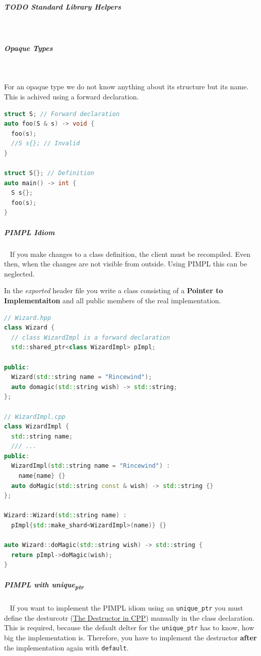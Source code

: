 \documentclass[11pt,twoside,landscape]{article}
\begin{document}
\begin{multicols}{2}
\subparagraph{{\bfseries\sffamily TODO} Standard Library Helpers} \
\label{sec:org0ee2676}
\subparagraph{Opaque Types} \
\label{sec:org2972fca}

For an opaque type we do not know anything about its structure but its name.
This is achived using a forward declaration.

\begin{lstlisting}[language=c++,label=lst:example-for-an-opaque-type,numbers=none]
struct S; // Forward declaration
auto foo(S & s) -> void {
  foo(s);
  //S s{}; // Invalid
}

struct S{}; // Definition
auto main() -> int {
  S s{};
  foo(s);
}
\end{lstlisting}

\subparagraph{PIMPL Idiom} \
\label{sec:org786722e}
If you make changes to a class definition, the client must be recompiled.
Even then, when the changes are not visible from outside.
Using PIMPL this can be neglected.

In the \emph{exported} header file you write a class consisting of a \textbf{Pointer to Implementaiton} and all public members of the real implementation.

\begin{lstlisting}[language=c++,caption={PIMPL example using shared\textsubscript{ptr}},captionpos=b,numbers=none]
// Wizard.hpp
class Wizard {
  // class WizardImpl is a forward declaration
  std::shared_ptr<class WizardImpl> pImpl;

public:
  Wizard(std::string name = "Rincewind");
  auto domagic(std::string wish) -> std::string;
};

// WizardImpl.cpp
class WizardImpl {
  std::string name;
  /// ...
public:
  WizardImpl(std::string name = "Rincewind") :
    name{name} {}
  auto doMagic(std::string const & wish) -> std::string {}
};

Wizard::Wizard(std::string name) :
  pImpl{std::make_shard<WizardImpl>(name)} {}

auto Wizard::doMagic(std::string wish) -> std::string {
  return pImpl->doMagic(wish);
}
\end{lstlisting}

\subparagraph{PIMPL with unique\textsubscript{ptr}} \
\label{sec:orgb1aac7d}
If you want to implement the PIMPL idiom using an \texttt{unique\_ptr} you must define the desturcotr (\href{../../../roam/20211119155746-the_destructor_in_cpp.org}{The Destructor in CPP}) manually in the class declaration.
This is required, because the default delter for the \texttt{unique\_ptr} has to know, how big the implementation is.
Therefore, you have to implement the destructor \textbf{after} the implementation again with \texttt{default}.


\end{multicols}
\end{document}
